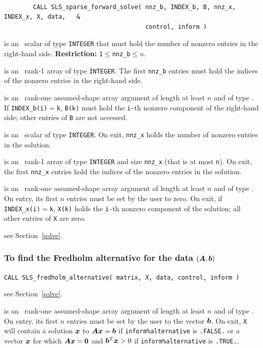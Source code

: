 \documentclass{galahad}
\newcommand{\packagename}{SLS}
\begin{document}
{\tt
\begin{verbatim}
        CALL SLS_sparse_forward_solve( nnz_b, INDEX_b, B, nnz_x, INDEX_x, X, data,   &
                                       control, inform )
\end{verbatim}
}
\vspace*{-4mm}
\begin{description}
 is an \intentin\ scalar of type  {\tt INTEGER} that
must hold the number of nonzero entries in the right-hand side.
{\bf Restriction:} {\tt 1$\le$nnz\_b$\le n$}.

  is an  \intentin\ rank-1 array of type {\tt INTEGER}.
The first {\tt nnz\_b} entries must hold the indices of the nonzero entries
in the right-hand side.

 is an  \intentin\ rank-one assumed-shape array argument of
length at least $n$ and of type \realdp.
If {\tt INDEX\_b(i)}$=${\tt k}, {\tt B(k)} must hold the {\tt i-}th
nonzero component of the right-hand side; other entries of {\tt B}
are not accessed.

  is an  \intentout\ scalar  of type  {\tt INTEGER}.
On exit, {\tt nnz\_x} holds the number of nonzero entries in the solution.

  is an  \intentout\ rank-1  array of type {\tt INTEGER} and
size {\tt nnz\_x} (that is at most {\tt n}). On exit, the first
{\tt nnz\_x} entries hold the indices of the nonzero entries in the solution.

 is an  \intentinout\ rank-one assumed-shape array argument of
length at least $n$ and of type \realdp.
On entry, its first $n$ entries must be set by the user to zero.
On exit, if {\tt INDEX\_x(i)}$=${\tt k}, {\tt X(k)} holds the {\tt i-}th
nonzero component of the solution; all other entries of {\tt X} are zero.

 see Section~\ref{solve}.

\end{description}

\subsubsection{To find the Fredholm alternative for the data $({\bm{A}},{\bm{b}})$}
\label{fredholm}

\hskip0.5in
{\tt CALL \packagename\_fredholm\_alternative( matrix, X, data, control,
 inform )}

\begin{description}

see Section~\ref{solve}.

 is an \intentinout\ rank-one assumed-shape array argument of
length at least $n$ and of type \realdp.
On entry, its first $n$ entries must be set by the user to the vector ${\bm{b}}$.
On exit, {\tt X} will contain a solution ${\bm{x}}$ to ${\bm{A}} {\bm{x}} = {\bm{b}}$ if
{\tt inform\%alternative} is {\tt .FALSE.} or a vector ${\bm{x}}$ for which
${\bm{A}} {\bm{x}} = {\bm{0}}$ and ${\bm{b}}^T {\bm{x}} > 0$ if
{\tt inform\%alternative} is {\tt .TRUE.}.
\end{description}
\end{document}
